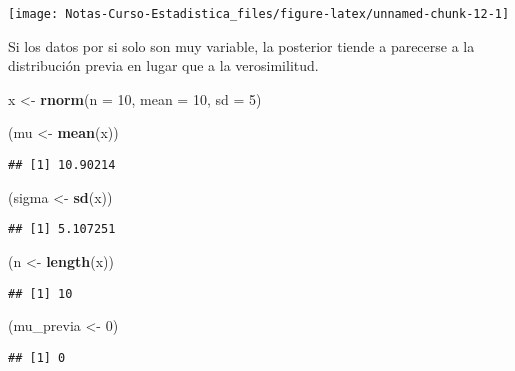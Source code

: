 \documentclass[
  12pt,
]{book}
\newenvironment{Shaded}{\begin{snugshade}}{\end{snugshade}}
\newcommand{\DataTypeTok}[1]{\textcolor[rgb]{0.13,0.29,0.53}{#1}}
\newcommand{\DecValTok}[1]{\textcolor[rgb]{0.00,0.00,0.81}{#1}}
\newcommand{\KeywordTok}[1]{\textcolor[rgb]{0.13,0.29,0.53}{\textbf{#1}}}
\newcommand{\NormalTok}[1]{#1}
\newcommand{\StringTok}[1]{\textcolor[rgb]{0.31,0.60,0.02}{#1}}
\begin{document}
\begin{center}\texttt{[image: Notas-Curso-Estadistica\_files/figure-latex/unnamed-chunk-12-1]} \end{center}

Si los datos por si solo son muy variable, la posterior tiende a parecerse a la
distribución previa en lugar que a la verosimilitud.

\begin{Shaded}
\begin{Highlighting}[]
\NormalTok{x \textless{}{-}}\StringTok{ }\KeywordTok{rnorm}\NormalTok{(}\DataTypeTok{n =} \DecValTok{10}\NormalTok{, }\DataTypeTok{mean =} \DecValTok{10}\NormalTok{, }\DataTypeTok{sd =} \DecValTok{5}\NormalTok{)}

\NormalTok{(mu \textless{}{-}}\StringTok{ }\KeywordTok{mean}\NormalTok{(x))}
\end{Highlighting}
\end{Shaded}

\begin{verbatim}
## [1] 10.90214
\end{verbatim}

\begin{Shaded}
\begin{Highlighting}[]
\NormalTok{(sigma \textless{}{-}}\StringTok{ }\KeywordTok{sd}\NormalTok{(x))}
\end{Highlighting}
\end{Shaded}

\begin{verbatim}
## [1] 5.107251
\end{verbatim}

\begin{Shaded}
\begin{Highlighting}[]
\NormalTok{(n \textless{}{-}}\StringTok{ }\KeywordTok{length}\NormalTok{(x))}
\end{Highlighting}
\end{Shaded}

\begin{verbatim}
## [1] 10
\end{verbatim}

\begin{Shaded}
\begin{Highlighting}[]
\NormalTok{(mu\_previa \textless{}{-}}\StringTok{ }\DecValTok{0}\NormalTok{)}
\end{Highlighting}
\end{Shaded}

\begin{verbatim}
## [1] 0
\end{verbatim}
\end{document}
